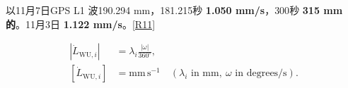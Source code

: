 \documentclass[11pt,a4paper]{article}
\numberwithin{equation}{section}
\numberwithin{figure}{section}
\begin{document}
{\cjkfont 以}\allowbreak{}11{\cjkfont 月}\allowbreak{}7{\cjkfont 日}\allowbreak{}GPS L1 {\cjkfont 波}\allowbreak{}190.294 mm{\cjkfont ，}\allowbreak{}181.215{\cjkfont 秒}\allowbreak{} \textbf{1.050 mm/\allowbreak{}s}{\cjkfont ，}\allowbreak{}300{\cjkfont 秒}\allowbreak{} \textbf{315 mm{\cjkfont 的}\allowbreak{}}{\cjkfont 。}\allowbreak{}11{\cjkfont 月}\allowbreak{}3{\cjkfont 日}\allowbreak{} \textbf{1.122 mm/\allowbreak{}s}{\cjkfont 。}\allowbreak{}\hyperlink{ref-R11}{[R11]}

\begin{equation}\begin{aligned}\left|\dot L_{\mathrm{WU},i}\right|&=\lambda_i\frac{|\omega|}{360^{\circ}},\\ \left[\dot L_{\mathrm{WU},i}\right]&=\mathrm{mm\,s^{-1}}\quad(\lambda_i\text{ in mm},\ \omega\text{ in degrees/s}).\end{aligned}\label{eq:zh-windup}\end{equation}
\end{document}
